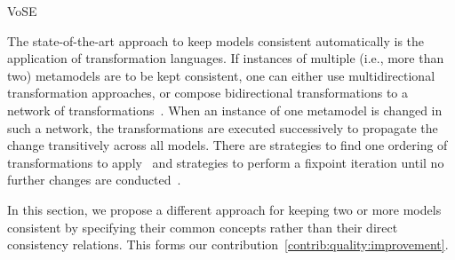 \begin{copiedFrom}{VoSE}

The state-of-the-art approach to keep models consistent automatically is the application of transformation languages.
If instances of multiple (i.e., more than two) metamodels are to be kept consistent, one can either use multidirectional transformation approaches, or compose bidirectional transformations to a network of transformations~\cite{cleve2019dagstuhl}.
When an instance of one metamodel is changed in such a network, the transformations are executed successively to propagate the change transitively across all models.
There are strategies to find one ordering of transformations to apply~\cite{stevens2020BidirectionalTransformationLarge-SoSym} and strategies to perform a fixpoint iteration until no further changes are conducted~\cite{klare2019icmt}.

In this section, we propose a different approach for keeping two or more models consistent by specifying their common concepts rather than their direct consistency relations.
This forms our contribution~\autoref{contrib:quality:improvement}.




\end{copiedFrom}
